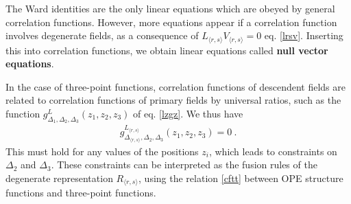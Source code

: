 \documentclass[12pt, a4paper, notitlepage, twoside]{report}
\numberwithin{equation}{section}
\theoremstyle{break}
\begin{document}
The Ward identities are the only linear equations which are obeyed by general correlation functions.
However, more equations appear if a correlation function involves degenerate fields, as a consequence of $L_{\langle r,s \rangle} V_{\langle r,s \rangle} = 0$ eq. \eqref{lrsv}.
Inserting this into correlation functions, we obtain linear equations called \textbf{\boldmath null vector equations}. 

In the case of three-point functions, correlation functions of descendent fields are related to correlation functions of primary fields by universal ratios, such as the function $g^{L}_{\Delta_1,\Delta_2,\Delta_3}(z_1,z_2,z_3)$ of eq. \eqref{lzgz}.
We thus have 
\begin{align}
 g^{L_{\langle r,s \rangle}}_{\Delta_{\langle r,s \rangle},\Delta_2,\Delta_3}(z_1,z_2,z_3) = 0 \ .
\end{align}
This must hold for any values of the positions $z_i$, which leads to constraints on $\Delta_2$ and $\Delta_3$.
These constraints can be interpreted as the fusion rules of the degenerate representation $R_{\langle r,s \rangle}$, using the relation \eqref{cftt} between OPE structure functions and three-point functions.
\end{document}
